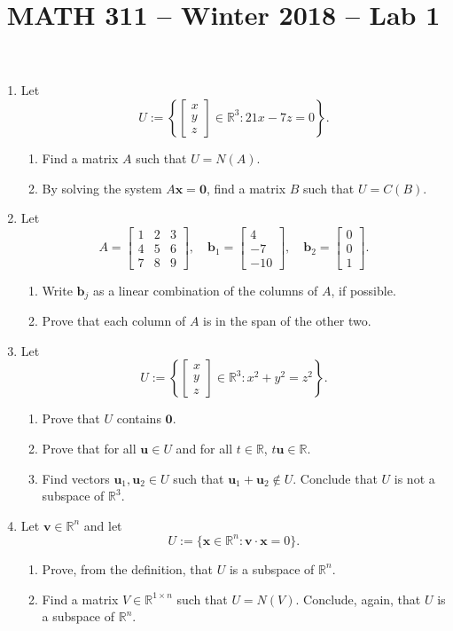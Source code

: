 \documentclass[12pt]{amsart}
\newcommand{\RR}{\mathbb{R}}
\theoremstyle{definition} \newtheorem{definition}[theorem]{Definition}
\newcommand{\bb}{\mathbf{b}}
\newcommand{\bu}{\mathbf{u}}
\newcommand{\bv}{\mathbf{v}}
\newcommand{\bx}{\mathbf{x}}
\newcommand{\bzero}{\mathbf{0}}
\newcommand{\mat}[1]{\begin{bmatrix}#1\end{bmatrix}}
\begin{document}
\title{MATH 311 -- Winter 2018 -- Lab 1}
\maketitle

\begin{enumerate}
  \setlength{\itemsep}{1em}
  \item Let
    \[
      U := \left\{\mat{x\\y\\z}\in\RR^3 : 21x-7z = 0\right\}.
    \]
    \begin{enumerate}
  \setlength{\itemsep}{0.5em}
      \item Find a matrix $A$ such that $U=N(A)$.
      \item By solving the system $A\bx=\bzero$, find a matrix $B$ such that $U=C(B)$.
    \end{enumerate}


  \item Let
    \[
      A = \mat{1 & 2 & 3\\4 & 5 & 6\\7 & 8 & 9},\quad
      \bb_1 = \mat{4\\-7\\-10},\quad
      \bb_2 = \mat{0\\0\\1}.
    \]
    \begin{enumerate}
  \setlength{\itemsep}{0.5em}
      \item Write $\bb_j$ as a linear combination of the columns of $A$, if possible.
      \item Prove that each column of $A$ is in the span of the other two.
    \end{enumerate}

  \item Let
    \[
      U := \left\{\mat{x\\y\\z}\in\RR^3 : x^2 + y^2 = z^2\right\}.
    \]
    \begin{enumerate}
  \setlength{\itemsep}{0.5em}
      \item Prove that $U$ contains $\bzero$.
      \item Prove that for all $\bu\in U$ and for all $t\in\RR$, $t\bu\in\RR$.
      \item Find vectors $\bu_1,\bu_2\in U$ such that $\bu_1+\bu_2\notin U$. Conclude that $U$ is not a subspace of $\RR^3$.
    \end{enumerate}
  \item Let $\bv\in\RR^n$ and let
    \[
      U := \{\bx\in\RR^n : \bv\cdot\bx = 0\}.
    \]
    \begin{enumerate}
  \setlength{\itemsep}{0.5em}
      \item Prove, from the definition, that $U$ is a subspace of $\RR^n$.
      \item Find a matrix $V\in \RR^{1\times n}$ such that $U=N(V)$. Conclude, again, that $U$ is a subspace of $\RR^n$.
    \end{enumerate}


\end{enumerate}
\end{document}
